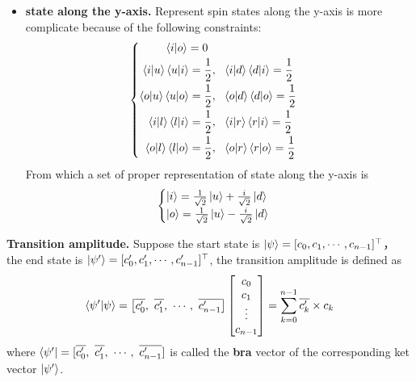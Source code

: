 \documentclass{easyclass}
\begin{document}
\begin{itemize}
  	\item \textbf{state along the y-axis.} Represent spin states along the y-axis is more complicate because of the following constraints:
  	\begin{equation}
  		\begin{cases}
  			\begin{aligned}
	  			\braket{i|o}=0\ \ &\\
	  			\braket{i|u}\braket{u|i}=\frac{1}{2}, &\ \ \braket{i|d}\braket{d|i}=\frac{1}{2}\\
	  			\braket{o|u}\braket{u|o}=\frac{1}{2}, &\ \ \braket{o|d}\braket{d|o}=\frac{1}{2}\\
	  			\braket{i|l}\braket{l|i}=\frac{1}{2}, &\ \ \braket{i|r}\braket{r|i}=\frac{1}{2}\\
	  			\braket{o|l}\braket{l|o}=\frac{1}{2}, &\ \ \braket{o|r}\braket{r|o}=\frac{1}{2}\\
  			\end{aligned}
  		\end{cases}
  	\end{equation}
    From which a set of proper representation of state along the y-axis is 
    \begin{equation}
    	\begin{cases}
    		\ket{i} = \frac{1}{\sqrt{2}}\ket{u} + \frac{i}{\sqrt{2}}\ket{d}\\
    		\ket{o} = \frac{1}{\sqrt{2}}\ket{u} - \frac{i}{\sqrt{2}}\ket{d}
    	\end{cases}
   \end{equation}
\end{itemize}

\textbf{Transition amplitude.} Suppose the start state is $\ket{\psi}=[c_0,c_1,\cdots,c_{n-1}]^{\top}$， the end state is $\ket{\psi^{\prime}}=[c_0^{\prime}, c_1^{\prime}, \cdots, c_{n-1}^{\prime}]^{\top}$, the transition amplitude is defined as 
\begin{equation}
	\braket{\psi^{\prime}|\psi} = 
	\begin{bmatrix}\overline{c_0^{\prime}},\ \overline{c_1^{\prime}},\ \cdots,\ \overline{c_{n-1}^{\prime}}\end{bmatrix}
	\begin{bmatrix}c_0\\ c_1\\ \vdots\\ c_{n-1}\end{bmatrix}
	=\sum_{k=0}^{n-1}\overline{c_{k}^{\prime}}\times c_k		
\end{equation}
where $\bra{\psi^{\prime}}=[\overline{c_0^{\prime}},\ \overline{c_1^{\prime}},\ \cdots,\ \overline{c_{n-1}^{\prime}}]$ is called the \textbf{bra} vector of the corresponding ket vector $\ket{\psi^{\prime}}$.
\end{document}
